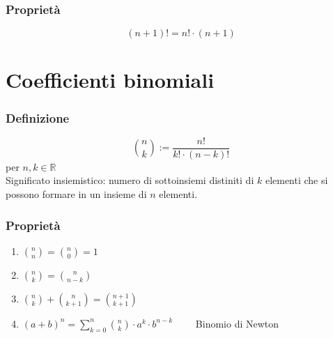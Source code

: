 \documentclass[a4paper]{article}
\begin{document}
\subsubsection*{Proprietà}
\[(n + 1)! = n! \cdot (n + 1)\]
\vspace{15pt}

\section{Coefficienti binomiali}
\subsubsection*{Definizione}
\[\binom{n}{k} := \frac{n!}{k! \cdot (n - k)!}\]
per \(n, k \in \mathbb{R}\) \\
Significato insiemistico: numero di sottoinsiemi distiniti di \(k\) elementi che si possono formare
in un insieme di \(n\) elementi.

\subsubsection*{Proprietà}
\begin{enumerate}
	\item \(\displaystyle \binom{n}{n} = \binom{n}{0} = 1\)
	\item \(\displaystyle \binom{n}{k} = \binom{n}{n-k}\)
	\item \(\displaystyle \binom{n}{k} + \binom{n}{k+1} = \binom{n+1}{k+1}\)
	\item \(\displaystyle (a + b) ^ n = \sum_{k = 0} ^ {n} \binom{n}{k} \cdot a ^ k \cdot b ^ {n - k} \qquad\) Binomio di Newton
\end{enumerate}

\newpage
\end{document}
